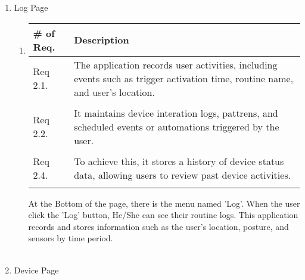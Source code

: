 \begin{enumerate}[label=\arabic*.]
\begin{enumerate}[label*={\arabic*.},ref=\theenumi.\arabic*]
                    
          \end{enumerate}

    \item {\large{Log Page}}
          \begin{enumerate}[label*={\arabic*.},ref=\theenumi.\arabic*]
              \setlength{\itemindent}{0.5cm}
              \item
                    \begin{table}[H]
                        \center
                        \begin{tabular}{m{1.4cm} m{5.5cm}}
                            \toprule
                            \# of Req. & Description                                                                                                                   \\
                            \midrule
                            Req 2.1.   & The application records user activities, including events such as trigger activation time, routine name, and user's location. \\\\
                            Req 2.2.   & It maintains device interation logs, pattrens, and scheduled events or automations triggered by the user.                     \\\\
                            Req 2.4.   & To achieve this, it stores a history of device status data, allowing users to review past device activities.                  \\\\
                            \bottomrule
                        \end{tabular}
                    \end{table}

                    At the Bottom of the page, there is the menu named 'Log'. When the user click the 'Log' button, He/She can see their routine logs. This application records and stores information such as the user's location, posture, and sensors by time period. \\\\

          \end{enumerate}

    \item {\large{Device Page}}\\




\end{enumerate}
